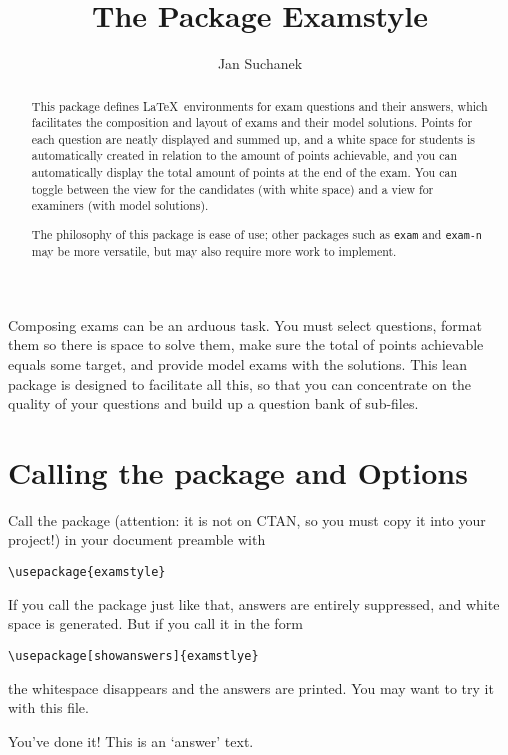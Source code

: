 \documentclass[a4paper]{scrartcl}
\title{The Package Examstyle}
\subtitle{\begin{answer-}...in answer mode\end{answer-}}
\author{Jan Suchanek}
\begin{document}
\maketitle


\pagealert

\begin{abstract}
This package defines \LaTeX\ environments for exam questions and their answers, which facilitates the composition and layout of exams and their model solutions. Points for each question are neatly displayed and summed up, and a white space for students is automatically created in relation to the amount of points achievable, and you can automatically display the total amount of points at the end of the exam. You can toggle between the view for the candidates  (with white space) and a view for examiners (with model solutions). 

The philosophy of this package is ease of use; other packages such as \verb|exam| and \verb|exam-n| may be more versatile, but may also require more work to implement. 
\end{abstract}



Composing exams can be an arduous task. You must select questions, format them so there is space to solve them, make sure the total of points achievable equals some target, and provide model  exams with the solutions. This lean package is designed to facilitate all this, so that you can concentrate on the quality of your questions and build up a question bank of sub-files.

\noindent
\section*{Calling the package and Options}
Call the package (attention: it is not on CTAN, so you must copy it into your project!) in your document preamble with
\begin{verbatim}
\usepackage{examstyle}
\end{verbatim}
 If you call the package just like that, answers are entirely suppressed, and white space is generated. But if you call it in the form
\begin{verbatim}
\usepackage[showanswers]{examstlye}
\end{verbatim}
the whitespace disappears and the answers are printed.  You may want to try it with this file. 


\begin{answer}
You've done it! This is an `answer' text.
\end{answer}
\end{document}
